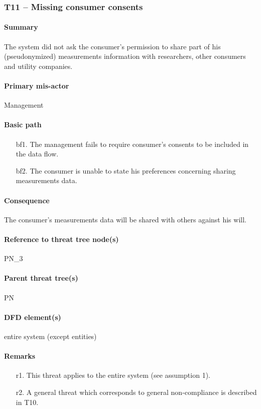 \subsubsection{T11 -- Missing consumer consents}

\paragraph{Summary} The system did not ask the consumer's permission to share
part of his (pseudonymized) measurements information with researchers, other
consumers and utility companies.

\paragraph{Primary mis-actor} Management

\paragraph{Basic path}
\begin{enumerate}
	\item[bf1.] The management fails to require consumer's consents to be included
	in the data flow.
	\item[bf2.] The consumer is unable to state his preferences concerning sharing
	measurements data.
\end{enumerate}

\paragraph{Consequence} The consumer's measurements data will be shared with
others against his will. 

\paragraph{Reference to threat tree node(s)} PN\_3

\paragraph{Parent threat tree(s)} PN

\paragraph{DFD element(s)} entire system (except entities)

\paragraph{Remarks}
\begin{enumerate}
     \item[r1.] This threat applies to the entire system (see assumption 1).
     \item[r2.] A general threat which corresponds to general non-compliance is
     described in T10.
\end{enumerate}
